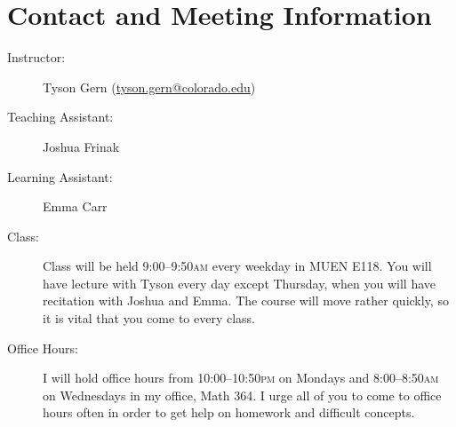 \documentclass[11pt]{article}
\begin{document}
\drawtitle

\section*{Contact and Meeting Information}

\begin{description}
\item[Instructor:] Tyson Gern
  (\href{mailto:tyson.gern@colorado.edu}{tyson.gern@colorado.edu})
\item[Teaching Assistant:] Joshua Frinak
\item[Learning Assistant:] Emma Carr
\item[Class:] Class will be held 9:00--9:50\textsc{am} every weekday in
  MUEN E118.  You will have lecture with Tyson every day except
  Thursday, when you will have recitation with Joshua and Emma.  The
  course will move rather quickly, so it is vital that you come to
  every class.
\item[Office Hours:] I will hold office hours from
  10:00--10:50\textsc{pm} on Mondays and 8:00--8:50\textsc{am} on
  Wednesdays in my office, Math 364.  I urge all of you to come to
  office hours often in order to get help on homework and difficult
  concepts.
\end{description}
\end{document}
